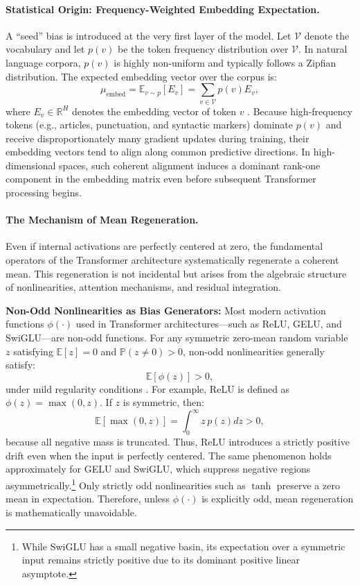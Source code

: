 \paragraph{Statistical Origin: Frequency-Weighted Embedding Expectation.}
A ``seed'' bias is introduced at the very first layer of the model. Let $\mathcal{V}$ denote the vocabulary and let $p(v)$ be the token frequency distribution over $\mathcal{V}$. In natural language corpora, $p(v)$ is highly non-uniform and typically follows a Zipfian distribution. The expected embedding vector over the corpus is:
\begin{equation}
\mu_{\text{embed}} = \mathbb{E}_{v \sim p}[E_v] = \sum_{v \in \mathcal{V}} p(v) E_v,
\end{equation}
where $E_v \in \mathbb{R}^H$ denotes the embedding vector of token $v$ \citep{mikolov2013a, arora2017}.
Because high-frequency tokens (e.g., articles, punctuation, and syntactic markers) dominate $p(v)$ and receive disproportionately many gradient updates during training, their embedding vectors tend to align along common predictive directions. In high-dimensional spaces, such coherent alignment induces a dominant rank-one component in the embedding matrix even before subsequent Transformer processing begins.

\paragraph{The Mechanism of Mean Regeneration.}
Even if internal activations are perfectly centered at zero, the fundamental operators of the Transformer architecture systematically regenerate a coherent mean. This regeneration is not incidental but arises from the algebraic structure of nonlinearities, attention mechanisms, and residual integration.

\textbf{Non-Odd Nonlinearities as Bias Generators:} Most modern activation functions $\phi(\cdot)$ used in Transformer architectures---such as ReLU, GELU, and SwiGLU---are non-odd functions. For any symmetric zero-mean random variable $z$ satisfying $\mathbb{E}[z]=0$ and $\mathbb{P}(z \neq 0) > 0$, non-odd nonlinearities generally satisfy:
\begin{equation}
\mathbb{E}[\phi(z)] > 0,
\end{equation}
under mild regularity conditions \citep{timkey2021, puccetti2022}.
For example, ReLU is defined as $\phi(z) = \max(0,z)$. If $z$ is symmetric, then:
\begin{equation}
\mathbb{E}[\max(0,z)] = \int_0^\infty z \, p(z) dz > 0,
\end{equation}
because all negative mass is truncated. Thus, ReLU introduces a strictly positive drift even when the input is perfectly centered. The same phenomenon holds approximately for GELU and SwiGLU, which suppress negative regions asymmetrically.\footnote{While SwiGLU has a small negative basin, its expectation over a symmetric input remains strictly positive due to its dominant positive linear asymptote.} Only strictly odd nonlinearities such as $\tanh$ preserve a zero mean in expectation. Therefore, unless $\phi(\cdot)$ is explicitly odd, mean regeneration is mathematically unavoidable.

